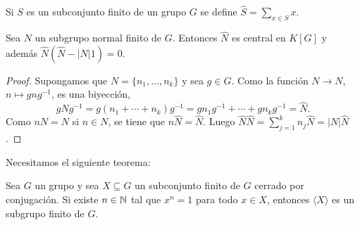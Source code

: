 %

Si $S$ es un subconjunto finito de un grupo $G$ se define
$\widehat{S}=\sum_{x\in S}x$. 

\begin{lemma}
	\label{lemma:sumN}
	Sea $N$ un subgrupo normal finito de $G$. Entonces $\widehat{N}$ es central
	en $K[G]$ y además $\widehat{N}(\widehat{N}-|N|1)=0$.
\end{lemma}

\begin{proof}
	Supongamos que $N=\{n_1,\dots,n_k\}$ y 
	sea $g\in G$. Como la función $N\to N$, $n\mapsto gng^{-1}$, es una biyección, 
	\[
		g\widehat{N}g^{-1}=g(n_1+\cdots+n_k)g^{-1}=gn_1g^{-1}+\cdots+gn_kg^{-1}=\widehat{N}.
	\]
	Como $nN=N$ si $n\in N$, se tiene que $n\widehat{N}=\widehat{N}$. Luego
	$\widehat{N}\widehat{N}=\sum_{j=1}^k n_j\widehat{N}=|N|\widehat{N}$.
\end{proof}

Necesitamos el siguiente teorema:

\begin{theorem}[Dietzmann]
	\label{theorem:Dietzmann} 
	Sea $G$ un grupo y sea $X\subseteq G$ un
	subconjunto finito de $G$ cerrado por conjugación. Si existe $n\in\mathbb{N}$ tal
	que $x^n=1$ para todo $x\in X$, entonces $\langle X\rangle$ es un subgrupo
	finito de $G$.
\end{theorem}

